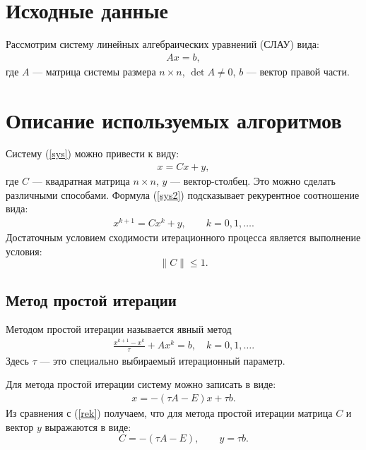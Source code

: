 \documentclass[12pt,a4paper]{article}
\begin{document}
\newpage

\section{Исходные данные}

Рассмотрим систему линейных алгебраических уравнений (СЛАУ) вида:
\begin{gather}
A x=b,
\label{sys}
\end{gather}
где $A$ --- матрица системы размера $n \times n$, $\det A \ne 0$, $b$ --- вектор правой части.

\section{Описание используемых алгоритмов}

Систему (\ref{sys}) можно привести к виду:
\begin{gather}
x=C x+y,
\label{sys2}
\end{gather}
где $C$ --- квадратная матрица $n \times n$, $y$ --- вектор-столбец. Это можно сделать различными способами. Формула (\ref{sys2}) подсказывает рекурентное соотношение вида:
\begin{gather}
x^{k+1}=C x^k+y, \qquad k=0, 1, \ldots.
\label{rek}
\end{gather}
Достаточным условием сходимости итерационного процесса является выполнение условия:
$$
\|C\|\le 1.
$$

\subsection{Метод простой итерации}
Методом простой итерации называется явный метод
\begin{gather}
\frac{x^{k+1}-x^k}{\tau}+A x^k=b, \quad k=0,1,\ldots.
\end{gather}
Здесь $\tau$ --- это специально выбираемый итерационный параметр.

Для метода простой итерации систему можно записать в виде:
\begin{gather}
x=-(\tau A-E) x+\tau b.
\end{gather}
Из сравнения с (\ref{rek}) получаем, что для метода простой итерации матрица $C$ и вектор $y$ выражаются в виде:
$$
C=-(\tau A-E), \qquad y=\tau b.
$$ 
\end{document}
